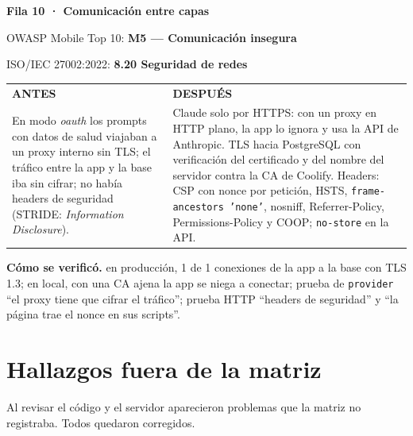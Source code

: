\documentclass[11pt,letterpaper]{article}
\makeatletter
\newcommand{\cod}[1]{\texttt{#1}}
\newcommand{\fila}[7]{%
  \par\vspace{8pt}\noindent
  \begin{minipage}{\linewidth}%
  {\large\bfseries\color{tinta}Fila #1 · #2}\par\vspace{2pt}
  {\small\color{gris}OWASP Mobile Top 10: \textbf{#3}\par
   ISO/IEC 27002:2022: \textbf{#4}\par}\vspace{4pt}
  \renewcommand{\arraystretch}{1.25}%
  \begin{tabularx}{\linewidth}{@{}>{\raggedright\arraybackslash\small}X@{\hspace{6pt}}>{\raggedright\arraybackslash\small}X@{}}
    \cellcolor{antesbg}\textbf{\color{antes}ANTES} & \cellcolor{despuesbg}\textbf{\color{despues}DESPUÉS} \\
    \cellcolor{antesbg}#5 & \cellcolor{despuesbg}#6 \\
  \end{tabularx}\par\vspace{3pt}
  {\small\textbf{Cómo se verificó.} #7}\par
  \end{minipage}\par\vspace{4pt}
}
\makeatother
\begin{document}
\fila{10}{Comunicación entre capas}{M5 — Comunicación insegura}{8.20 Seguridad de redes}
{En modo \textit{oauth} los prompts con datos de salud viajaban a un proxy interno sin TLS; el tráfico entre la app y la base iba sin cifrar; no había headers de seguridad (STRIDE: \textit{Information Disclosure}).}
{Claude solo por HTTPS: con un proxy en HTTP plano, la app lo ignora y usa la API de Anthropic. TLS hacia PostgreSQL con verificación del certificado y del nombre del servidor contra la CA de Coolify. Headers: CSP con nonce por petición, HSTS, \cod{frame-ancestors 'none'}, nosniff, Referrer-Policy, Permissions-Policy y COOP; \cod{no-store} en la API.}
{en producción, 1 de 1 conexiones de la app a la base con TLS 1.3; en local, con una CA ajena la app se niega a conectar; prueba de \cod{provider} ``el proxy tiene que cifrar el tráfico''; prueba HTTP ``headers de seguridad'' y ``la página trae el nonce en sus scripts''.}

\clearpage
\section{Hallazgos fuera de la matriz}\label{sec:extra}

Al revisar el código y el servidor aparecieron problemas que la matriz no
registraba. Todos quedaron corregidos.
\end{document}
